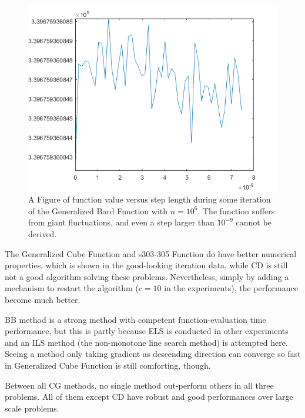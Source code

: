 \documentclass[11pt,a4paper]{article}
\begin{document}
\begin{figure}[ht]
\vskip 0.2in
\label{fig1}
\begin{center}
\centerline{\includegraphics[width=\columnwidth]{fig1}}
\caption{A Figure of function value versus step length during some iteration of the Generalized Bard Function with $n=10^6$. The function suffers from giant fluctuations, and even a step larger than $10^{-9}$ cannot be derived.}
\end{center}
\vskip -0.2in
\end{figure}

The Generalized Cube Function and s303-305 Function do have better numerical properties, which is shown in the good-looking iteration data, while CD is still not a good algorithm solving these problems. Nevertheless, simply by adding a mechanism to restart the algorithm ($c=10$ in the experiments), the performance become much better.

BB method is a strong method with competent function-evaluation time performance, but this is partly because ELS is conducted in other experiments and an ILS method (the non-monotone line search method) is attempted here. Seeing a method only taking gradient as descending direction can converge so fast in Generalized Cube Function is still comforting, though.

Between all CG methods, no single method out-perform others in all three problems. All of them except CD have robust and good performances over large scale problems.

%
%
\end{document}
